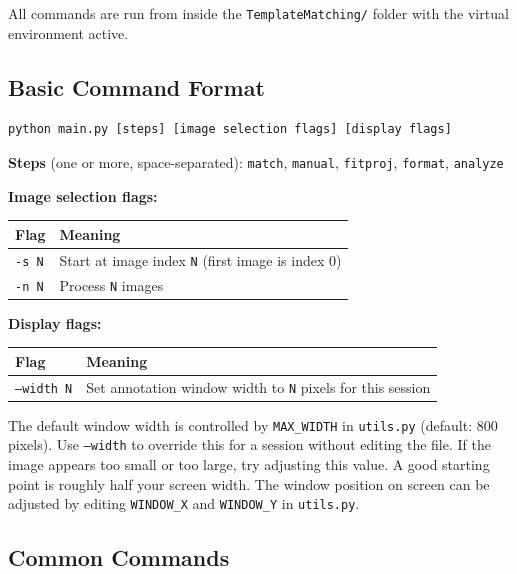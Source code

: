 \documentclass[11pt, letterpaper]{article}
\begin{document}
All commands are run from inside the \texttt{TemplateMatching/} folder with the virtual
environment active.

\subsection*{Basic Command Format}

\begin{lstlisting}
python main.py [steps] [image selection flags] [display flags]
\end{lstlisting}

\textbf{Steps} (one or more, space-separated): \texttt{match}, \texttt{manual},
\texttt{fitproj}, \texttt{format}, \texttt{analyze}

\textbf{Image selection flags:}
\begin{center}
\begin{tabular}{ll}
\toprule
\textbf{Flag} & \textbf{Meaning} \\
\midrule
\texttt{-s N} & Start at image index \texttt{N} (first image is index 0) \\
\texttt{-n N} & Process \texttt{N} images \\
\bottomrule
\end{tabular}
\end{center}

\textbf{Display flags:}
\begin{center}
\begin{tabular}{ll}
\toprule
\textbf{Flag} & \textbf{Meaning} \\
\midrule
\texttt{--width N} & Set annotation window width to \texttt{N} pixels for this session \\
\bottomrule
\end{tabular}
\end{center}

The default window width is controlled by \texttt{MAX\_WIDTH} in \texttt{utils.py} (default: 800 pixels).
Use \texttt{--width} to override this for a session without editing the file. If the image appears
too small or too large, try adjusting this value. A good starting point is roughly half your screen
width. The window position on screen can be adjusted by editing \texttt{WINDOW\_X} and \texttt{WINDOW\_Y}
in \texttt{utils.py}.

\subsection*{Common Commands}
\end{document}
